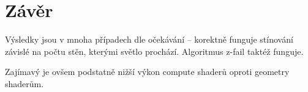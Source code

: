 \documentclass[a4paper, 12pt]{article}
\begin{document}

\section{Závěr}

Výsledky jsou v mnoha případech dle očekávání -- korektně funguje stínování závislé na počtu stěn, kterými světlo prochází. Algoritmus z-fail taktéž funguje.

Zajímavý je ovšem podstatně nižší výkon compute shaderů oproti geometry shaderům.


\begin{flushleft}
  
\end{flushleft}

\end{document}
